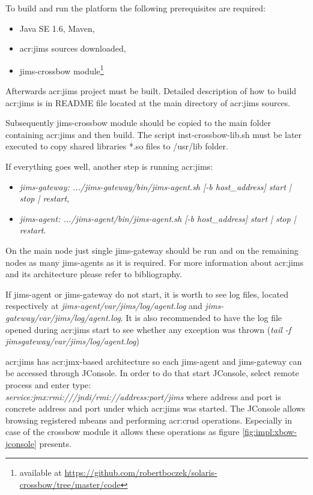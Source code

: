 \documentclass[11pt,openany]{book}
\begin{document}
      To build and run the platform the following prerequisites are required:

      \begin{itemize}
        \item Java SE 1.6, Maven,
        \item \gls{acr:jims} sources downloaded,
        \item jims-crossbow module\footnote{available at \url{https://github.com/robertboczek/solaris-crossbow/tree/master/code}}
      \end{itemize}

      Afterwards \gls{acr:jims} project must be built. Detailed description of how to build \gls{acr:jims} is in README
      file located at the main directory of \gls{acr:jims} sources.

      Subsequently jims-crossbow module should be copied to the main folder containing \gls{acr:jims} and then build. The script
      inst-crossbow-lib.sh must be later executed to copy shared libraries *.so files to /usr/lib folder.

      If everything goes well, another step is running \gls{acr:jims}:

      \begin{itemize}
        \item \textit{jims-gateway: .../jims-gateway/bin/jims-agent.sh [-b host\_address] start | stop | restart},
        \item \textit{jims-agent: .../jims-agent/bin/jims-agent.sh [-b host\_address] start | stop | restart}.
      \end{itemize}

      On the main node just single jims-gateway should be run and on the remaining nodes as many jims-agents as it is
      required. For more information about \gls{acr:jims} and its architecture please refer to bibliography.

      If jims-agent or jims-gateway do not start, it is worth to see log files, located respectively at
      \textit{jims-agent/var/jims/log/agent.log} and \textit{jims-gateway/var/jims/log/agent.log}.  It is also
      recommended to have the log file opened during \gls{acr:jims} start to see whether any exception was thrown
      (\textit{tail -f jims\-gateway/var/jims/log/agent.log})

      \gls{acr:jims} has \gls{acr:jmx}-based architecture so each jims-agent and jims-gateway can be accessed through
      JConsole. In order to do that start JConsole, select remote process and enter type: \\
      \textit{service:jmx:rmi:///jndi/rmi://address:port/jims} where address and port is concrete address and port under
      which \gls{acr:jims} was started. The JConsole allows browsing registered mbeans and performing \gls{acr:crud}
      operations. Especially in case of the crossbow module it allows these operations as figure
      \ref{fig:impl:xbow-jconsole} presents.
\end{document}
